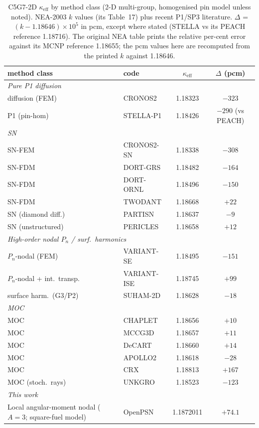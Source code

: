 \documentclass[11pt,a4paper]{article}
\newcommand{\keff}{\kappa_{\mathrm{eff}}}
\begin{document}
\begin{table}[h]
\centering
\caption{C5G7-2D $\keff$ by method class (2-D multi-group, homogenised pin
model unless noted). NEA-2003 $k$ values (its Table~17) plus recent P1/SP3
literature. $\Delta$ = $(k-1.18646)\times10^{5}$ in pcm, except where stated
(STELLA vs its PEACH reference 1.18716). The original NEA table prints the
relative per-cent error against its MCNP reference 1.18655; the pcm values
here are recomputed from the printed $k$ against 1.18646.}
\label{tab:lit}
\small
\begin{tabular}{@{}p{6.4cm}lcc@{}}
\toprule
method class & code & $\keff$ & $\Delta$ (pcm) \\
\midrule
\multicolumn{4}{l}{\emph{Pure P1 diffusion}}\\
diffusion (FEM) & CRONOS2 & 1.18323 & $-323$ \\
P1 (pin-hom) & STELLA-P1~\cite{stella2017} & 1.18426 & $-290$ (vs PEACH)\\
\midrule
\multicolumn{4}{l}{\emph{SN}}\\
SN-FEM & CRONOS2-SN & 1.18338 & $-308$ \\
SN-FDM & DORT-GRS & 1.18482 & $-164$ \\
SN-FDM & DORT-ORNL & 1.18496 & $-150$ \\
SN-FDM & TWODANT & 1.18668 & $+22$ \\
SN (diamond diff.) & PARTISN & 1.18637 & $-9$ \\
SN (unstructured) & PERICLES & 1.18658 & $+12$ \\
\midrule
\multicolumn{4}{l}{\emph{High-order nodal $P_n$ / surf.\ harmonics}}\\
$P_n$-nodal (FEM) & VARIANT-SE & 1.18495 & $-151$ \\
$P_n$-nodal + int.\ transp.\ & VARIANT-ISE & 1.18745 & $+99$ \\
surface harm.\ (G3/P2) & SUHAM-2D & 1.18628 & $-18$ \\
\midrule
\multicolumn{4}{l}{\emph{MOC}}\\
MOC & CHAPLET & 1.18656 & $+10$ \\
MOC & MCCG3D & 1.18657 & $+11$ \\
MOC & DeCART & 1.18660 & $+14$ \\
MOC & APOLLO2 & 1.18618 & $-28$ \\
MOC & CRX & 1.18813 & $+167$ \\
MOC (stoch.\ rays) & UNKGRO & 1.18523 & $-123$ \\
\midrule
\multicolumn{4}{l}{\emph{This work}}\\
\rowcolor{gray!15}
Local angular-moment nodal ($A{=}3$; square-fuel model) & OpenPSN & 1.1872011 & $+74.1$ \\
\bottomrule
\end{tabular}


\end{table}
\end{document}
